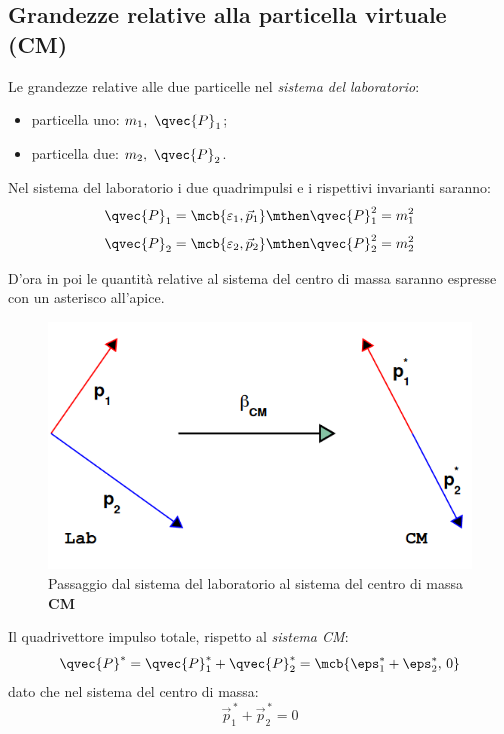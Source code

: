 \subsection{Grandezze relative alla particella virtuale 
	(CM)}
Le grandezze relative alle due particelle nel \textit{sistema del laboratorio}:
\begin{itemize}
	\item particella uno: $m_1,\ \qvec{P}_1$;
	\item particella due: $m_2,\ \qvec{P}_2$.
\end{itemize}
Nel sistema del laboratorio i due quadrimpulsi e i rispettivi invarianti
saranno:
\begin{equation}
	\qvec{P}_1 = \mcb{\varepsilon_1,\vec{p}_1}
	\mthen
	\qvec{P}_{1}^{2} = m_1^2
\end{equation}
\begin{equation}
	\qvec{P}_2 = \mcb{\varepsilon_2,\vec{p}_2}
	\mthen
	\qvec{P}_{2}^{2} = m_2^2
\end{equation}

\begin{note}[]
	D'ora in poi le quantità relative al sistema del centro di massa saranno
	espresse con un asterisco all'apice.
\end{note}

\begin{figure}[ht]
	\centering
	\includegraphics[scale=0.4]{./img/2020_03_20/particles1.png}
	\caption{Passaggio dal sistema del laboratorio al sistema del centro di massa
		\textbf{CM}}
	\label{fig:particles1}
\end{figure}

Il quadrivettore impulso totale, rispetto al \textit{sistema CM}:
\begin{equation}
	\qvec{P}^\ast
	= \qvec{P}_1^\ast + \qvec{P}_2^\ast
	= \mcb{\eps_1^\ast + \eps_2^\ast,\, 0}
\end{equation}
dato che nel sistema del centro di massa:
\begin{equation}
	\vec{p}_{1}^{\,\ast} + \vec{p}_{2}^{\,\ast} = 0
\end{equation}

